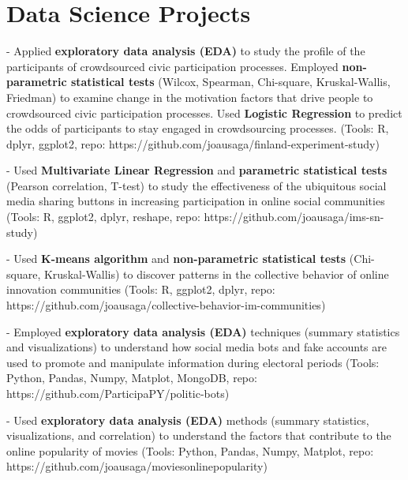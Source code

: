 
\section{Data Science Projects}

-  Applied \textbf{exploratory data analysis (EDA)} to study the profile of the participants of crowdsourced civic participation processes. Employed \textbf{non-parametric statistical tests} (Wilcox, Spearman, Chi-square, Kruskal-Wallis, Friedman) to examine change in the motivation factors that drive people to crowdsourced civic participation processes. Used \textbf{Logistic Regression} to predict the odds of participants to stay engaged in crowdsourcing processes. (Tools: R, dplyr, ggplot2, repo: https://github.com/joausaga/finland-experiment-study)

-  Used \textbf{Multivariate Linear Regression} and \textbf{parametric statistical tests} (Pearson correlation, T-test) to study the effectiveness of the ubiquitous social media sharing buttons in increasing participation in online social communities (Tools: R, ggplot2, dplyr, reshape, repo: https://github.com/joausaga/ims-sn-study)

-  Used \textbf{K-means algorithm} and \textbf{non-parametric statistical tests} (Chi-square, Kruskal-Wallis) to discover patterns in the collective behavior of online innovation communities (Tools: R, ggplot2, dplyr, repo: https://github.com/joausaga/collective-behavior-im-communities)

-  Employed \textbf{exploratory data analysis (EDA)} techniques (summary statistics and visualizations) to understand how social media bots and fake accounts are used to promote and manipulate information during electoral periods (Tools: Python, Pandas, Numpy, Matplot, MongoDB, repo: https://github.com/ParticipaPY/politic-bots)



-  Used \textbf{exploratory data analysis (EDA)} methods (summary statistics, visualizations, and correlation) to understand the factors that contribute to the online popularity of movies (Tools: Python, Pandas, Numpy, Matplot, repo: https://github.com/joausaga/moviesonlinepopularity)


